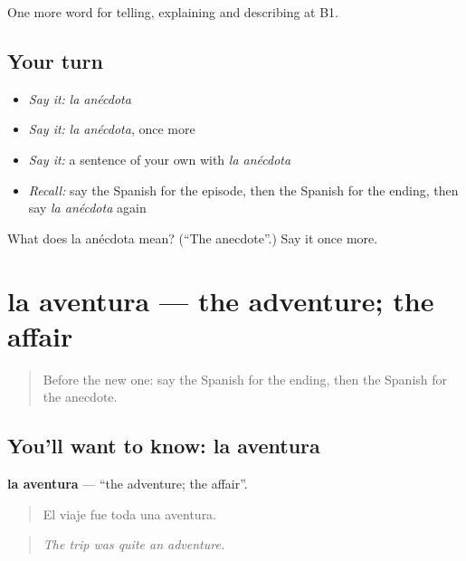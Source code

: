 \begin{grammarlens}[title={What you've built}]
One more word for telling, explaining and describing at B1.
\end{grammarlens}

\subsection*{Your turn}
\begin{itemize}
\raggedright
  \item \emph{Say it:} \emph{la anécdota}
  \item \emph{Say it:} \emph{la anécdota}, once more
  \item \emph{Say it:} a sentence of your own with \emph{la anécdota}
  \item \emph{Recall:} say the Spanish for the episode, then the Spanish for the ending, then say \emph{la anécdota} again
\end{itemize}

\begin{tcolorbox}[breakable,colback=teal!4,colframe=teal!35!black,title={Before you move on}]
What does la anécdota mean? (\textquotedblleft{}The anecdote\textquotedblright{}.) Say it once more.
\end{tcolorbox}
\section[la aventura]{la aventura — the adventure; the affair}

\label{lesson:ES-C566-aventura}



\begin{quote}
Before the new one: say the Spanish for the ending, then the Spanish for the anecdote.
\end{quote}

\subsection*{You'll want to know: la aventura}
\textbf{la aventura} — \textquotedblleft{}the adventure; the affair\textquotedblright{}.

\begin{quote}
El viaje fue toda una aventura.
\end{quote}

\begin{quote}
\emph{The trip was quite an adventure.}
\end{quote}


